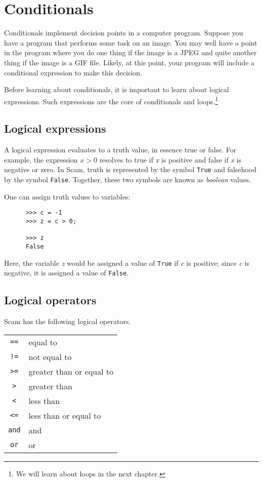 \chapter{Conditionals}
\label{Conditionals}

Conditionals implement decision points in a computer program.
Suppose you have a program that performs some task on an
image. You may well have a point in the program where you
do one thing if the image is a JPEG and quite another
thing if the image is a GIF file. Likely, at this point,
your program will include a conditional expression to make
this decision.

Before learning about conditionals, it is important to
learn about logical expressions. Such expressions are the
core of conditionals and loops.\footnote{
We will learn about loops in the next chapter.
}

\section{Logical expressions}

A logical expression evaluates to a truth value, in essence true or
false. For example, the expression $x > 0$
resolves to true if {\it x} is positive
and false if {\it x} is negative or zero. In Scam, truth is represented by
the symbol {\tt True} and falsehood
by the symbol {\tt False}.
Together,
these two symbols are known as {\it {\sc boolean}} values.

One can assign truth values to variables:

\begin{verbatim}
      >>> c = -1
      >>> z = c > 0;

      >>> z
      False
\end{verbatim}

Here, the variable {\it z} would be assigned a value of {\tt True}
if {\it c} is positive;
since {\it c} is negative, it is assigned a value of {\tt False}.

\section{Logical operators}

Scam has the following logical operators.
 
\begin{tabular}{cl}
    {\tt ==}    & equal to \\
    {\tt !=}    & not equal to \\
    {\tt >=}    & greater than or equal to \\
    {\tt >}     & greater than \\
    {\tt <}     & less than \\
    {\tt <=}    & less than or equal to \\
    {\tt and}   & and \\
    {\tt or}    & or \\
\end{tabular}


